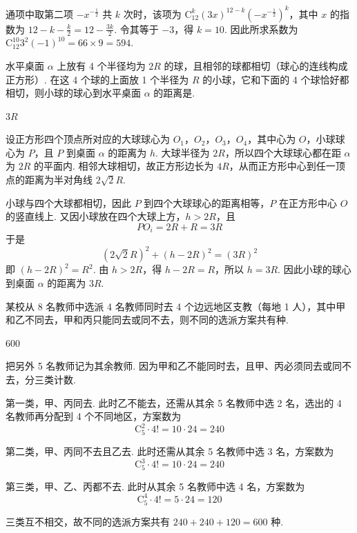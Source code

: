 \begin{solution}
通项中取第二项 \(-x^{-\frac{1}{2}}\) 共 \(k\) 次时，该项为 \(\mathrm C_{12}^{k}(3x)^{12-k}(-x^{-\frac{1}{2}})^k\)，其中 \(x\) 的指数为 \(12-k-\frac{k}{2}=12-\frac{3k}{2}\). 令其等于 \(-3\)，得 \(k=10\). 因此所求系数为 \(\mathrm C_{12}^{10}3^2(-1)^{10}=66\times9=594\).
\end{solution}

\begin{problem}
水平桌面 \(\alpha\) 上放有 4 个半径均为 \(2R\) 的球，且相邻的球都相切（球心的连线构成正方形）. 在这 4 个球的上面放 1 个半径为 \(R\) 的小球，它和下面的 4 个球恰好都相切，则小球的球心到水平桌面 \(\alpha\) 的距离是\fillinblank{}.
\end{problem}

\begin{answer}
\(3R\)
\end{answer}

\begin{solution}
设正方形四个顶点所对应的大球球心为 \(O_1\)，\(O_2\)，\(O_3\)，\(O_4\)，其中心为 \(O\)，小球球心为 \(P\)，且 \(P\) 到桌面 \(\alpha\) 的距离为 \(h\). 大球半径为 \(2R\)，所以四个大球球心都在距 \(\alpha\) 为 \(2R\) 的平面内. 相邻大球相切，故正方形边长为 \(4R\)，从而正方形中心到任一顶点的距离为半对角线 \(2\sqrt{2}R\).

小球与四个大球都相切，因此 \(P\) 到四个大球球心的距离相等，\(P\) 在正方形中心 \(O\) 的竖直线上. 又因小球放在四个大球上方，\(h>2R\)，且
\[
PO_i=2R+R=3R
\]
于是
\[
(2\sqrt{2}R)^2+(h-2R)^2=(3R)^2
\]
即 \((h-2R)^2=R^2\). 由 \(h>2R\)，得 \(h-2R=R\)，所以 \(h=3R\). 因此小球的球心到桌面 \(\alpha\) 的距离为 \(3R\).
\end{solution}

\begin{problem}
某校从 8 名教师中选派 4 名教师同时去 4 个边远地区支教（每地 1 人），其中甲和乙不同去，甲和丙只能同去或同不去，则不同的选派方案共有\fillinblank{}种.
\end{problem}

\begin{answer}
\(600\)
\end{answer}

\begin{solution}
把另外 5 名教师记为其余教师. 因为甲和乙不能同时去，且甲、丙必须同去或同不去，分三类计数.

第一类，甲、丙同去. 此时乙不能去，还需从其余 5 名教师中选 2 名，选出的 4 名教师再分配到 4 个不同地区，方案数为
\[
\mathrm C_5^2\cdot4!=10\cdot24=240
\]

第二类，甲、丙同不去且乙去. 此时还需从其余 5 名教师中选 3 名，方案数为
\[
\mathrm C_5^3\cdot4!=10\cdot24=240
\]

第三类，甲、乙、丙都不去. 此时从其余 5 名教师中选 4 名，方案数为
\[
\mathrm C_5^4\cdot4!=5\cdot24=120
\]

三类互不相交，故不同的选派方案共有 \(240+240+120=600\) 种.
\end{solution}

